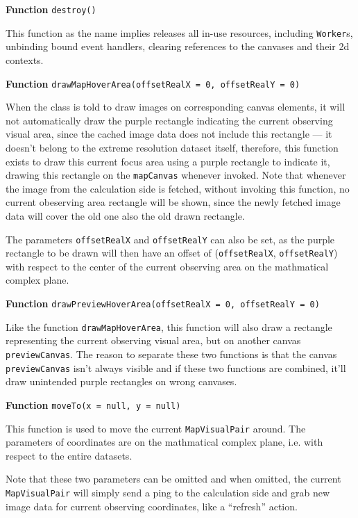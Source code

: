 \textbf{Function} \verb|destroy()|

This function as the name implies releases all in-use resources, including \texttt{Worker}s, unbinding bound event handlers, clearing references to the canvases and their 2d contexts.

\textbf{Function} \verb|drawMapHoverArea(offsetRealX = 0, offsetRealY = 0)|

When the class is told to draw images on corresponding canvas elements, it will not automatically draw the purple rectangle indicating the current observing visual area, since the cached image data does not include this rectangle --- it doesn't belong to the extreme resolution dataset itself, therefore, this function exists to draw this current focus area using a purple rectangle to indicate it, drawing this rectangle on the \texttt{mapCanvas} whenever invoked. Note that whenever the image from the calculation side is fetched, without invoking this function, no current obeserving area rectangle will be shown, since the newly fetched image data will cover the old one also the old drawn rectangle.

The parameters \texttt{offsetRealX} and \texttt{offsetRealY} can also be set, as the purple rectangle to be drawn will then have an offset of (\texttt{offsetRealX}, \texttt{offsetRealY}) with respect to the center of the current observing area on the mathmatical complex plane.

\textbf{Function} \verb|drawPreviewHoverArea(offsetRealX = 0, offsetRealY = 0)|

Like the function \texttt{drawMapHoverArea}, this function will also draw a rectangle representing the current observing visual area, but on another canvas \texttt{previewCanvas}. The reason to separate these two functions is that the canvas \texttt{previewCanvas} isn't always visible and if these two functions are combined, it'll draw unintended purple rectangles on wrong canvases.

\textbf{Function} \verb|moveTo(x = null, y = null)|

This function is used to move the current \texttt{MapVisualPair} around. The parameters of coordinates are on the mathmatical complex plane, i.e. with respect to the entire datasets.

Note that these two parameters can be omitted and when omitted, the current \texttt{MapVisualPair} will simply send a ping to the calculation side and grab new image data for current observing coordinates, like a ``refresh'' action.

